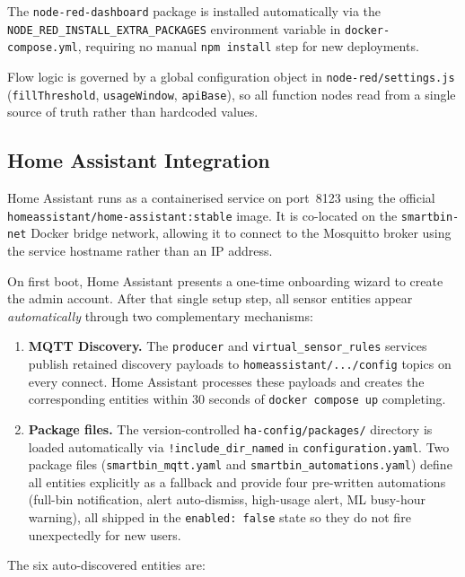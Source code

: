 \documentclass[10pt,a4paper]{article}
\begin{document}
The \texttt{node-red-dashboard} package is installed automatically via the \texttt{NODE\_RED\_INSTALL\_EXTRA\_PACKAGES} environment variable in \texttt{docker-compose.yml}, requiring no manual \texttt{npm install} step for new deployments.

Flow logic is governed by a global configuration object in \texttt{node-red/settings.js} (\texttt{fillThreshold}, \texttt{usageWindow}, \texttt{apiBase}), so all function nodes read from a single source of truth rather than hardcoded values.

\subsection{Home Assistant Integration}

Home Assistant runs as a containerised service on port~8123 using the official \texttt{homeassistant/home-assistant:stable} image. It is co-located on the \texttt{smartbin-net} Docker bridge network, allowing it to connect to the Mosquitto broker using the service hostname rather than an IP address.

On first boot, Home Assistant presents a one-time onboarding wizard to create the admin account. After that single setup step, all sensor entities appear \textit{automatically} through two complementary mechanisms:

\begin{enumerate}
\item \textbf{MQTT Discovery.} The \texttt{producer} and \texttt{virtual\_sensor\_rules} services publish retained discovery payloads to \texttt{homeassistant/.../config} topics on every connect. Home Assistant processes these payloads and creates the corresponding entities within 30 seconds of \texttt{docker compose up} completing.
\item \textbf{Package files.} The version-controlled \texttt{ha-config/packages/} directory is loaded automatically via \texttt{!include\_dir\_named} in \texttt{configuration.yaml}. Two package files (\texttt{smartbin\_mqtt.yaml} and \texttt{smartbin\_automations.yaml}) define all entities explicitly as a fallback and provide four pre-written automations (full-bin notification, alert auto-dismiss, high-usage alert, ML busy-hour warning), all shipped in the \texttt{enabled: false} state so they do not fire unexpectedly for new users.
\end{enumerate}

The six auto-discovered entities are:
\end{document}
